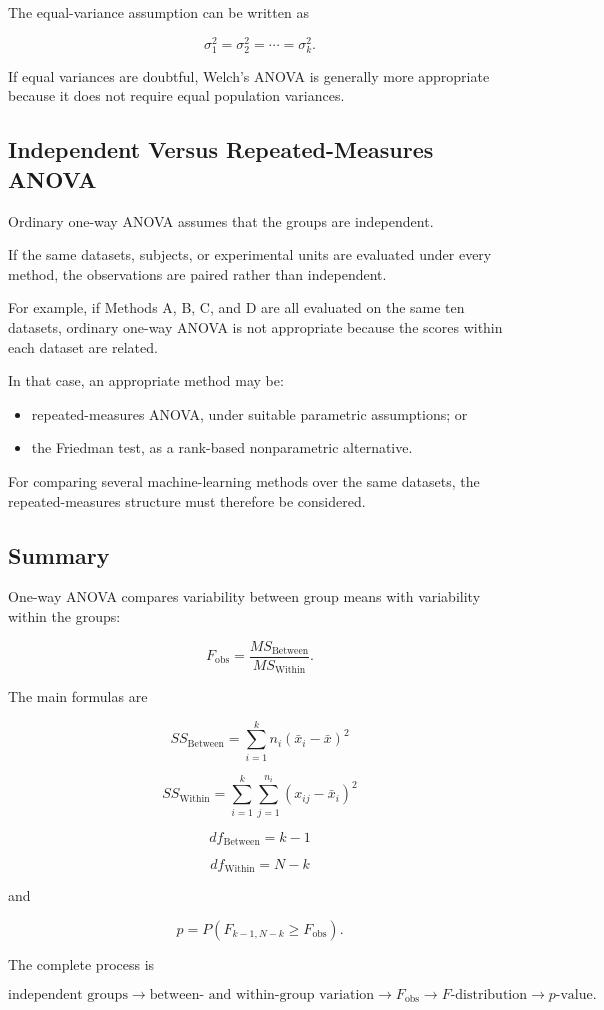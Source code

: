 \documentclass[11pt]{article}
\begin{document}
The equal-variance assumption can be written as

\[
\sigma_1^2
=
\sigma_2^2
=
\cdots
=
\sigma_k^2.
\]

If equal variances are doubtful, Welch's ANOVA is generally more
appropriate because it does not require equal population variances.

\subsection{Independent Versus Repeated-Measures ANOVA}

Ordinary one-way ANOVA assumes that the groups are independent.

If the same datasets, subjects, or experimental units are evaluated
under every method, the observations are paired rather than independent.

For example, if Methods A, B, C, and D are all evaluated on the same ten
datasets, ordinary one-way ANOVA is not appropriate because the scores
within each dataset are related.

In that case, an appropriate method may be:

\begin{itemize}[noitemsep]
    \item repeated-measures ANOVA, under suitable parametric
    assumptions; or

    \item the Friedman test, as a rank-based nonparametric alternative.
\end{itemize}

For comparing several machine-learning methods over the same datasets,
the repeated-measures structure must therefore be considered.

\subsection{Summary}

One-way ANOVA compares variability between group means with variability
within the groups:

\[
\boxed{
F_{\mathrm{obs}}
=
\frac{
MS_{\mathrm{Between}}
}{
MS_{\mathrm{Within}}
}.
}
\]

The main formulas are

\[
\boxed{
SS_{\mathrm{Between}}
=
\sum_{i=1}^{k}
n_i(\bar{x}_i-\bar{x})^2
}
\]

\[
\boxed{
SS_{\mathrm{Within}}
=
\sum_{i=1}^{k}
\sum_{j=1}^{n_i}
(x_{ij}-\bar{x}_i)^2
}
\]

\[
\boxed{
df_{\mathrm{Between}}=k-1
}
\]

\[
\boxed{
df_{\mathrm{Within}}=N-k
}
\]

and

\[
\boxed{
p
=
P\left(
F_{k-1,N-k}
\geq
F_{\mathrm{obs}}
\right).
}
\]

The complete process is

\[
\boxed{
\text{independent groups}
\rightarrow
\text{between- and within-group variation}
\rightarrow
F_{\mathrm{obs}}
\rightarrow
F\text{-distribution}
\rightarrow
p\text{-value}.
}
\]
\end{document}
